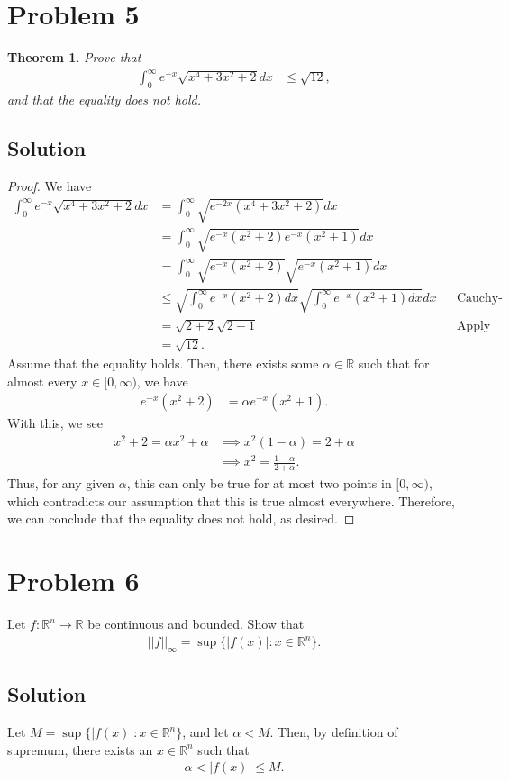 \documentclass[10pt,a4paper]{article}
\theoremstyle{theorem}
\newtheorem{theorem}{Theorem}
\theoremstyle{definition}
\begin{document}
\section*{Problem 5}
\begin{theorem}
Prove that 
\begin{align*}
\int_0^\infty e^{-x} \sqrt{x^4 + 3x^2 + 2} dx &\leq \sqrt{12},
\end{align*}
and that the equality does not hold.
\end{theorem}

\subsection*{Solution}
\begin{proof}
We have
\begin{align*}
\int_0^\infty e^{-x} \sqrt{x^4 + 3x^2 + 2} dx &= \int_0^\infty \sqrt{e^{-2x}(x^4 + 3x^2 + 2)} dx\\
&= \int_0^\infty \sqrt{e^{-x}(x^2 + 2)e^{-x}(x^2 + 1)} dx\\
&= \int_0^\infty \sqrt{e^{-x}(x^2 + 2)} \sqrt{e^{-x}(x^2 + 1)} dx\\
&\leq \sqrt{ \int_0^\infty e^{-x}(x^2 + 2)dx} \sqrt{\int_0^\infty e^{-x}(x^2 + 1)dx} dx && \text{Cauchy-Schwarz's inequality}\\
&= \sqrt{ 2 + 2 } \sqrt{2 + 1} && \text{Apply integration by parts twice}\\
&= \sqrt{12}.
\end{align*}
Assume that the equality holds. Then, there exists some $\alpha \in \mathbb{R}$ such that for almost every $x \in [0, \infty)$, we have
\begin{align*}
e^{-x}(x^2 + 2) &= \alpha e^{-x}(x^2 + 1).
\end{align*}
With this, we see
\begin{align*}
x^2 + 2 = \alpha x^2 + \alpha &\implies x^2(1 - \alpha) = 2 + \alpha\\
&\implies x^2 = \frac{1 - \alpha}{2 + \alpha}.
\end{align*}
Thus, for any given $\alpha$, this can only be true for at most two points in $[0, \infty)$, which contradicts our assumption that this is true almost everywhere. Therefore, we can conclude that the equality does not hold, as desired.
\end{proof}

\section*{Problem 6}
Let $f: \mathbb{R}^n \to \mathbb{R}$ be continuous and bounded. Show that 
\begin{align*}
||f||_\infty = \sup \{|f(x)| : x \in \mathbb{R}^n \}.
\end{align*}

\subsection*{Solution}
Let $M = \sup \{|f(x)| : x \in \mathbb{R}^n \}$, and let $\alpha < M$. Then, by definition of supremum, there exists an $x \in \mathbb{R}^n$ such that 
\begin{align*}
\alpha < |f(x)| \leq M.
\end{align*}
\end{document}
